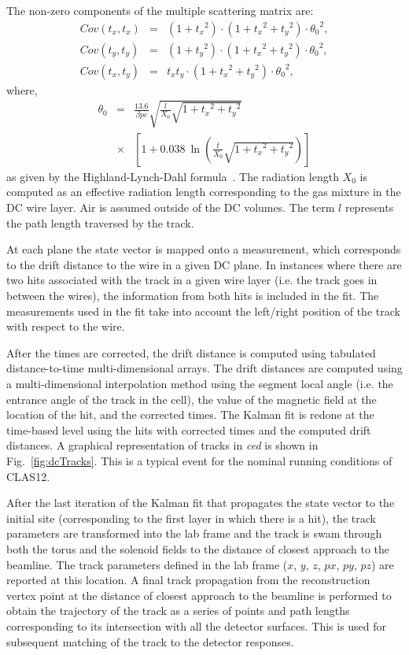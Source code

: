 The non-zero components of the multiple scattering matrix are:
\begin{eqnarray}
Cov (t_x , t_x) &=& (1+{t_x}^2 )\cdot (1+{t_x}^2 + {t_y}^2 )\cdot {\theta_0}^2 , \nonumber \\
Cov (t_y , t_y) &=& (1+{t_y}^2 )\cdot (1+{t_x}^2 + {t_y}^2 )\cdot {\theta_0}^2 , \nonumber \\
Cov (t_x , t_y) &=&  t_x t_y\cdot (1+{t_x}^2 + {t_y}^2 )\cdot {\theta_0}^2 ,
\end{eqnarray}
\noindent
where,
\begin{eqnarray}
  {\theta_0} &=& \frac{13.6}{\beta pc}\sqrt{\frac{l}{X_0}\sqrt{1+{t_x}^2+{t_y}^2}}\\
  &\times&\left[ {1+0.038~\ln \left({\frac{t}{X_0}\sqrt{1+{t_x}^2+{t_y}^2}}\right) }\right] \nonumber
\end{eqnarray}
\noindent
as given by the Highland-Lynch-Dahl formula~\cite{Highland-Lynch-Dahl}. The radiation length $X_0$ is computed
as an effective radiation length corresponding to the gas mixture in the DC wire layer. Air is assumed outside of
the DC volumes. {\color{red}The term $l$ represents the path length traversed by the track.}

At each plane the state vector is mapped onto a measurement, which corresponds to the drift distance to the
wire in a given DC plane.  In instances where there are two hits associated with the track in a given wire layer
(i.e. the track goes in between the wires), the information from both hits is included in the fit. The measurements
used in the fit take into account the left/right position of the track with respect to the wire.

After the times are corrected, the drift distance is computed using tabulated distance-to-time multi-dimensional
arrays. The drift distances are computed using a multi-dimensional interpolation method using the segment local
angle (i.e. the entrance angle of the track in the cell), the value of the magnetic field at the location of the hit, and
the corrected times. The Kalman fit is redone at the time-based level using the hits with corrected times and the
computed drift distances. A graphical representation of tracks in {\it ced} is shown in Fig.~\ref{fig:dcTracks}. This
is a typical event for the nominal running conditions of CLAS12. 

After the last iteration of the Kalman fit that propagates the state vector to the initial site (corresponding to the first
layer in which there is a hit), the track parameters are transformed into the lab frame and the track is swam through
both the torus and the solenoid fields to the distance of closest approach to the beamline. The track parameters
defined in the lab frame ($x$, $y$, $z$, $px$, $py$, $pz$) are reported at this location.  A final track propagation
from the reconstruction vertex point at the distance of closest approach to the beamline is performed to obtain the
trajectory of the track as a series of points and path lengths corresponding to its intersection with all the detector
surfaces. This is used for subsequent matching of the track to the detector responses.


